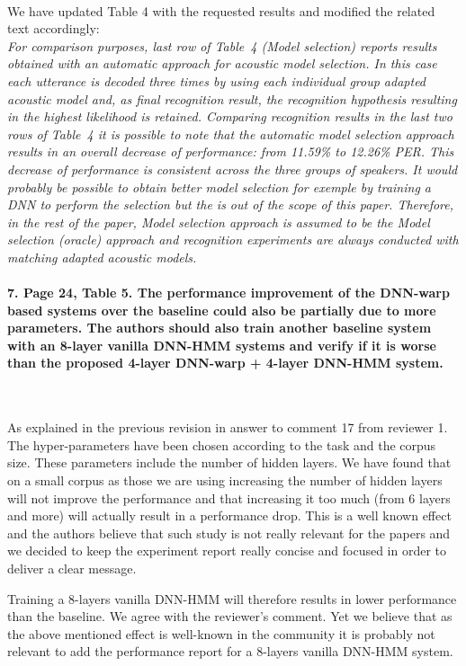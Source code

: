 \documentclass[]{article}
\begin{document}
~

We have updated Table 4 with the requested results and modified the related text accordingly:\\
\textit{For comparison purposes, last row of Table~4 ({\em Model selection}) reports results obtained with an automatic approach for acoustic model selection. In this case  each utterance is decoded three times by using each individual group adapted acoustic model and, as final recognition result, the recognition hypothesis resulting in the highest likelihood is retained. Comparing recognition results in the last two rows of Table~4 it is possible to note that  the automatic model selection approach results in an overall decrease of performance: from 11.59\% to 12.26\% PER. This decrease of performance is consistent across the three groups of speakers. It would probably be possible to obtain better model selection for exemple by training a DNN to perform the selection but the is out of the scope of this paper. Therefore, in the rest of the paper, {\em Model selection} approach is assumed to be the {\em Model selection (oracle)} approach and recognition experiments are always conducted with matching adapted acoustic models. }

\paragraph{7. Page 24, Table 5. The performance improvement of the DNN-warp based systems over the baseline could also be partially due to more parameters. The authors should also train another baseline system with an 8-layer vanilla DNN-HMM systems and verify if it is worse than the proposed 4-layer DNN-warp + 4-layer DNN-HMM system.}

~

As explained in the previous revision in answer to comment 17 from reviewer 1. The hyper-parameters have been chosen according to the task and the corpus size. These parameters include the number of hidden layers. We have found that on a small corpus as those we are using increasing the number of hidden layers will not improve the performance and that increasing it too much (from 6 layers and more) will actually result in a performance drop. This is a well known effect and the authors believe that such study is not really relevant for the papers and we decided to keep the experiment report really concise and focused in order to deliver a clear message.
 
Training a 8-layers vanilla DNN-HMM will therefore results in lower performance than the baseline. We agree with the reviewer's comment. Yet we believe that as the above mentioned effect is well-known in the community it is probably not relevant to add the performance report for a 8-layers vanilla DNN-HMM system.
\end{document}
